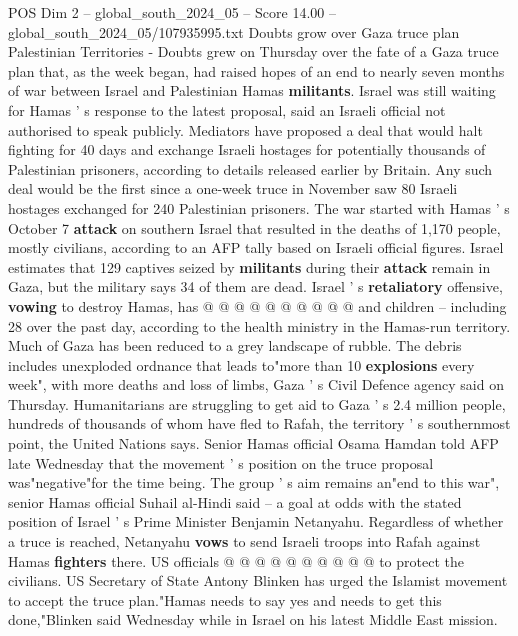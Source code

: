 \begin{textsample}{POS Dim 2 – global\_south\_2024\_05 – Score 14.00 – global\_south\_2024\_05/107935995.txt}  \label{ex:f2_pos_230}
Doubts grow over Gaza truce plan Palestinian Territories - Doubts grew on Thursday over the fate of a Gaza truce plan that, as the week began, had raised hopes of an end to nearly seven months of war between Israel and Palestinian Hamas \textbf{militants}.
Israel was still waiting for Hamas ' s response to the latest proposal, said an Israeli official not authorised to speak publicly.
Mediators have proposed a deal that would halt fighting for 40 days and exchange Israeli hostages for potentially thousands of Palestinian prisoners, according to details released earlier by Britain.
Any such deal would be the first since a one-week truce in November saw 80 Israeli hostages exchanged for 240 Palestinian prisoners.
The war started with Hamas ' s October 7 \textbf{attack} on southern Israel that resulted in the deaths of 1,170 people, mostly civilians, according to an AFP tally based on Israeli official figures.
Israel estimates that 129 captives seized by \textbf{militants} during their \textbf{attack} remain in Gaza, but the military says 34 of them are dead.
Israel ' s \textbf{retaliatory} offensive, \textbf{vowing} to destroy Hamas, has @ @ @ @ @ @ @ @ @ @ and children -- including 28 over the past day, according to the health ministry in the Hamas-run territory.
Much of Gaza has been reduced to a grey landscape of rubble.
The debris includes unexploded ordnance that leads to"more than 10 \textbf{explosions} every week", with more deaths and loss of limbs, Gaza ' s Civil Defence agency said on Thursday.
Humanitarians are struggling to get aid to Gaza ' s 2.4 million people, hundreds of thousands of whom have fled to Rafah, the territory ' s southernmost point, the United Nations says.
Senior Hamas official Osama Hamdan told AFP late Wednesday that the movement ' s position on the truce proposal was"negative"for the time being.
The group ' s aim remains an"end to this war", senior Hamas official Suhail al-Hindi said -- a goal at odds with the stated position of Israel ' s Prime Minister Benjamin Netanyahu.
Regardless of whether a truce is reached, Netanyahu \textbf{vows} to send Israeli troops into Rafah against Hamas \textbf{fighters} there.
US officials @ @ @ @ @ @ @ @ @ @ to protect the civilians.
US Secretary of State Antony Blinken has urged the Islamist movement to accept the truce plan."Hamas needs to say yes and needs to get this done,"Blinken said Wednesday while in Israel on his latest Middle East mission.

\end{textsample}

